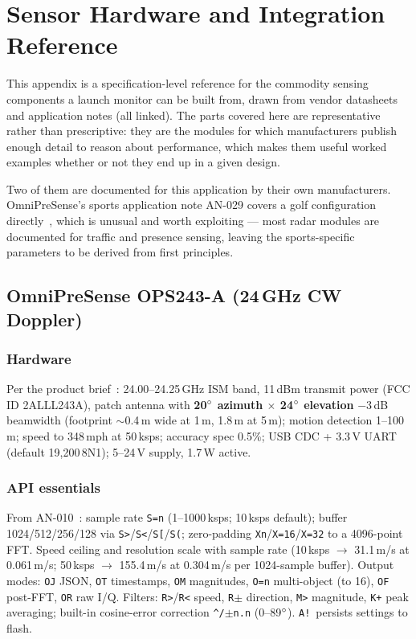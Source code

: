 \chapter{Sensor Hardware and Integration Reference}
\label{app:hardware}

This appendix is a specification-level reference for the commodity sensing
components a launch monitor can be built from, drawn from vendor datasheets
and application notes (all linked). The parts covered here are
representative rather than prescriptive: they are the modules for which
manufacturers publish enough detail to reason about performance, which makes
them useful worked examples whether or not they end up in a given design.

Two of them are documented for this application by their own manufacturers.
OmniPreSense's sports application note AN-029 covers a golf configuration
directly~\cite{an029}, which is unusual and worth exploiting --- most radar
modules are documented for traffic and presence sensing, leaving the
sports-specific parameters to be derived from first principles.

\section{OmniPreSense OPS243-A (24\,GHz CW Doppler)}

\subsection{Hardware}
Per the product brief~\cite{ops243brief}: 24.00--24.25\,GHz ISM band,
11\,dBm transmit power (FCC ID 2ALLL243A), patch antenna with
\textbf{20$\si{\degree}$ azimuth $\times$ 24$\si{\degree}$ elevation} $-3$\,dB
beamwidth (footprint $\sim$0.4\,m wide at 1\,m, 1.8\,m at 5\,m); motion
detection 1--100\,m; speed to 348\,mph at 50\,ksps; accuracy spec
0.5\%; USB CDC + 3.3\,V UART (default 19{,}200\,8N1); 5--24\,V supply,
1.7\,W active.

\subsection{API essentials}
From AN-010~\cite{an010}: sample rate \texttt{S=n} (1--1000\,ksps;
10\,ksps default); buffer 1024/512/256/128 via
\texttt{S>}/\texttt{S<}/\texttt{S[}/\texttt{S(}; zero-padding
\texttt{Xn}/\texttt{X=16}/\texttt{X=32} to a 4096-point FFT. Speed
ceiling and resolution scale with sample rate (10\,ksps
$\to$ 31.1\,m/s at 0.061\,m/s; 50\,ksps $\to$ 155.4\,m/s at
0.304\,m/s per 1024-sample buffer). Output modes: \texttt{OJ} JSON,
\texttt{OT} timestamps, \texttt{OM} magnitudes, \texttt{O=n}
multi-object (to 16), \texttt{OF} post-FFT, \texttt{OR} raw I/Q.
Filters: \texttt{R>}/\texttt{R<} speed, \texttt{R$\pm$} direction,
\texttt{M>} magnitude, \texttt{K+} peak averaging; built-in
cosine-error correction \texttt{\^{}/$\pm$n.n} (0--89$\si{\degree}$).
\texttt{A!}\ persists settings to flash.

